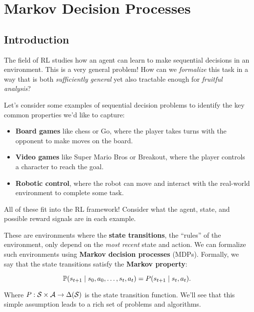 \documentclass[../main/main]{subfiles}
\begin{document}
\chapter{Markov Decision Processes}

\tableofcontents

\section{Introduction}

The field of RL studies how an agent can learn to make sequential decisions in an environment. This is a very general problem! How can we \emph{formalize} this task in a way that is both \emph{sufficiently general} yet also tractable enough for \emph{fruitful analysis}?

Let's consider some examples of sequential decision problems to identify the key common properties we'd like to capture:

\begin{itemize}
    \item \textbf{Board games} like chess or Go, where the player takes turns with the opponent to make moves on the board.
    \item \textbf{Video games} like Super Mario Bros or Breakout, where the player controls a character to reach the goal.
    \item \textbf{Robotic control}, where the robot can move and interact with the real-world environment to complete some task.
\end{itemize}



All of these fit into the RL framework! Consider what the agent, state, and possible reward signals are in each example.

These are environments where the \textbf{state transitions}, the ``rules'' of the environment, only depend on the \emph{most recent} state and action. We can formalize such environments using \textbf{Markov decision processes} (MDPs). Formally, we say that the state transitions satisfy the \textbf{Markov property}:

\[
    \P(s_{t+1} \mid s_0, a_0, \dots, s_t, a_t) = P(s_{t+1} \mid s_t, a_t).
\]

Where $P : \S \times \A \to \Delta(\S)$ is the state transition function. We'll see that this simple assumption leads to a rich set of problems and algorithms.
\end{document}
